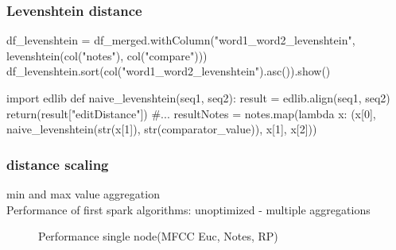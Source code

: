 \subsubsection{Levenshtein distance}

\begin{pythonCode}[frame=single,label={lst:levr},caption={Levenshtein DataFrame},captionpos=b]
df_levenshtein = df_merged.withColumn("word1_word2_levenshtein", levenshtein(col("notes"), col("compare")))
df_levenshtein.sort(col("word1_word2_levenshtein").asc()).show()
\end{pythonCode}

\begin{pythonCode}[frame=single,label={lst:levd},caption={Levenshtein RDD},captionpos=b]
import edlib
def naive_levenshtein(seq1, seq2):
    result = edlib.align(seq1, seq2)
    return(result["editDistance"])
#...
resultNotes = notes.map(lambda x: (x[0], naive_levenshtein(str(x[1]), str(comparator_value)), x[1], x[2]))
\end{pythonCode}


\subsubsection{distance scaling}

min and max value aggregation\\
Performance of first spark algorithms:
unoptimized - multiple aggregations
\FloatBarrier
\begin{figure}[htbp]
	\centering
	\caption{Performance single node(MFCC Euc, Notes, RP)}
	\label{perfspark1}
\end{figure}
\FloatBarrier

